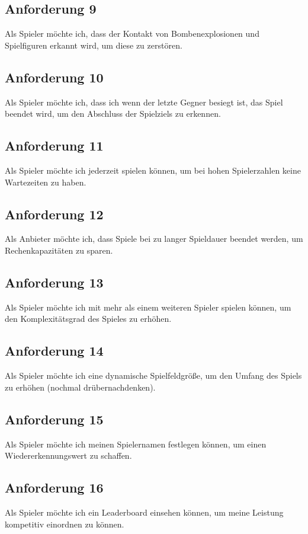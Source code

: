 \documentclass[conference]{IEEEtran}
\begin{document}
\subsection{Anforderung 9}
Als Spieler möchte ich, dass der Kontakt von Bombenexplosionen und Spielfiguren erkannt wird, um diese zu zerstören.

\subsection{Anforderung 10}
Als Spieler möchte ich, dass ich wenn der letzte Gegner besiegt ist, das Spiel beendet wird, um den Abschluss der Spielziels zu erkennen.

\subsection{Anforderung 11}
Als Spieler möchte ich jederzeit spielen können, um bei hohen Spielerzahlen keine Wartezeiten zu haben.

\subsection{Anforderung 12} 
Als Anbieter möchte ich, dass Spiele bei zu langer Spieldauer beendet werden, um Rechenkapazitäten zu sparen.

\subsection{Anforderung 13}
Als Spieler möchte ich mit mehr als einem weiteren Spieler spielen können, um den Komplexitätsgrad des Spieles zu erhöhen.

\subsection{Anforderung 14}
Als Spieler möchte ich eine dynamische Spielfeldgröße, um den Umfang des Spiels zu erhöhen (nochmal drübernachdenken).

\subsection{Anforderung 15}
Als Spieler möchte ich meinen Spielernamen festlegen können, um einen Wiedererkennungswert zu schaffen.

\subsection{Anforderung 16}
Als Spieler möchte ich ein Leaderboard einsehen können, um meine Leistung kompetitiv einordnen zu können.
\end{document}
